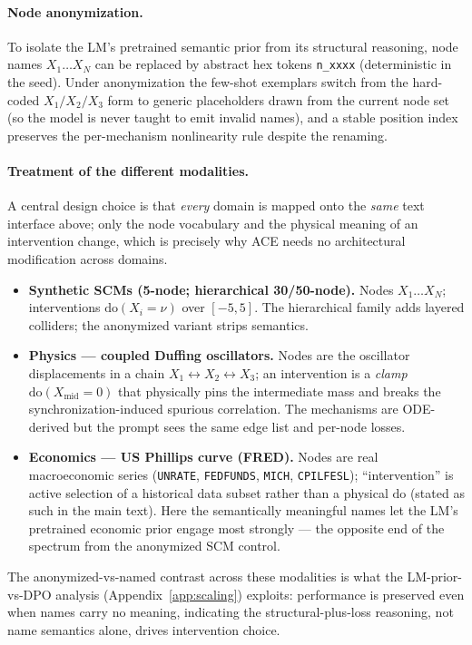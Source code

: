 \paragraph{Node anonymization.} To isolate the LM's pretrained semantic prior from its structural reasoning, node names $X_1\dots X_N$ can be replaced by abstract hex tokens \texttt{n\_xxxx} (deterministic in the seed). Under anonymization the few-shot exemplars switch from the hard-coded $X_1/X_2/X_3$ form to generic placeholders drawn from the current node set (so the model is never taught to emit invalid names), and a stable position index preserves the per-mechanism nonlinearity rule despite the renaming.

\paragraph{Treatment of the different modalities.} A central design choice is that \emph{every} domain is mapped onto the \emph{same} text interface above; only the node vocabulary and the physical meaning of an intervention change, which is precisely why ACE needs no architectural modification across domains.
\begin{itemize}[leftmargin=1.5em]
\item \textbf{Synthetic SCMs (5-node; hierarchical 30/50-node).} Nodes $X_1\dots X_N$; interventions $\mathrm{do}(X_i{=}\nu)$ over $[-5,5]$. The hierarchical family adds layered colliders; the anonymized variant strips semantics.
\item \textbf{Physics --- coupled Duffing oscillators.} Nodes are the oscillator displacements in a chain $X_1\!\leftrightarrow\!X_2\!\leftrightarrow\!X_3$; an intervention is a \emph{clamp} $\mathrm{do}(X_\text{mid}{=}0)$ that physically pins the intermediate mass and breaks the synchronization-induced spurious correlation. The mechanisms are ODE-derived but the prompt sees the same edge list and per-node losses.
\item \textbf{Economics --- US Phillips curve (FRED).} Nodes are real macroeconomic series (\texttt{UNRATE}, \texttt{FEDFUNDS}, \texttt{MICH}, \texttt{CPILFESL}); ``intervention'' is active selection of a historical data subset rather than a physical $\mathrm{do}$ (stated as such in the main text). Here the semantically meaningful names let the LM's pretrained economic prior engage most strongly --- the opposite end of the spectrum from the anonymized SCM control.
\end{itemize}
The anonymized-vs-named contrast across these modalities is what the LM-prior-vs-DPO analysis (Appendix~\ref{app:scaling}) exploits: performance is preserved even when names carry no meaning, indicating the structural-plus-loss reasoning, not name semantics alone, drives intervention choice.

